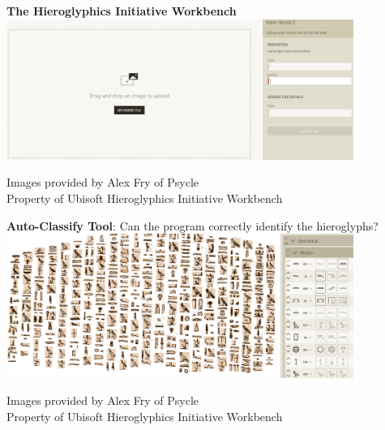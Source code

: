 \documentclass[unknownkeysallowed,usepdftitle=false, parskip=full, aspectratio=169]{beamer}
\newcommand{\secvariable}{nothing}
\newcommand{\mysection}[1]{\renewcommand{\secvariable}{#1}
}
\begin{document}
\mysection{radar}

\begin{frame}\label{\secvariable}

\begin{center}
\textbf{The Hieroglyphics Initiative Workbench}
\vspace{0.8cm}
\includegraphics[width=0.85\textwidth,keepaspectratio]{figure/workbench_2.PNG}
\end{center}
\vspace*{-\baselineskip}
\tiny Images provided by Alex Fry of Psycle
\\Property of Ubisoft Hieroglyphics Initiative Workbench
\vfill

\end{frame}

\mysection{line}

\begin{frame}\label{\secvariable}

\begin{center}
\vspace{0.05cm}
\textbf{Auto-Classify Tool}: Can the program correctly identify the hieroglyphs?
\vfill
\includegraphics[width=0.85\textwidth,keepaspectratio]{figure/PICO_36.png}
\end{center}
\parbox{\linewidth}{\tiny Images provided by Alex Fry of Psycle
\\Property of Ubisoft Hieroglyphics Initiative Workbench}

\end{frame}
\end{document}
